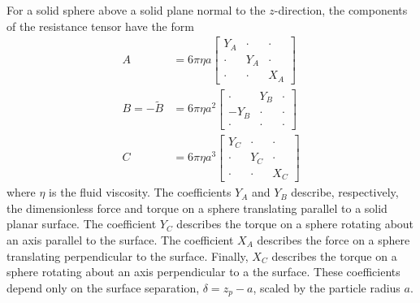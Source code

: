 For a solid sphere above a solid plane normal to the $z$-direction, the components of the resistance tensor have the form
\begin{align}
    A &=  6\pi \eta a \begin{bmatrix} 
        Y_A & \cdot & \cdot \\
        \cdot & Y_A & \cdot \\
        \cdot & \cdot & X_A  \end{bmatrix}
    \\
    B=-\tilde{B}&= 6\pi \eta a^2 \begin{bmatrix} 
        \cdot & Y_B & \cdot \\
        -Y_B & \cdot & \cdot \\
        \cdot & \cdot & \cdot  \end{bmatrix}
    \\
    C &= 6\pi \eta a^3 \begin{bmatrix} 
        Y_C & \cdot & \cdot \\
        \cdot & Y_C & \cdot \\
        \cdot & \cdot & X_C 
    \end{bmatrix} 
\end{align}
where $\eta$ is the fluid viscosity. The coefficients $Y_A$ and $Y_B$ describe, respectively, the dimensionless force and torque on a sphere translating parallel to a solid planar surface.\cite{ONeill1964a} The coefficient $Y_C$ describes the torque on a sphere rotating about an axis parallel to the surface.\cite{Dean1963} The coefficient $X_A$ describes the force on a sphere translating perpendicular to the surface.\cite{Brenner1961a}  Finally, $X_C$ describes the torque on a sphere rotating about an axis perpendicular to a the surface.\cite{Jeffrey1915} These coefficients depend only on the surface separation, $\delta=z_p-a$, scaled by the particle radius $a$.

